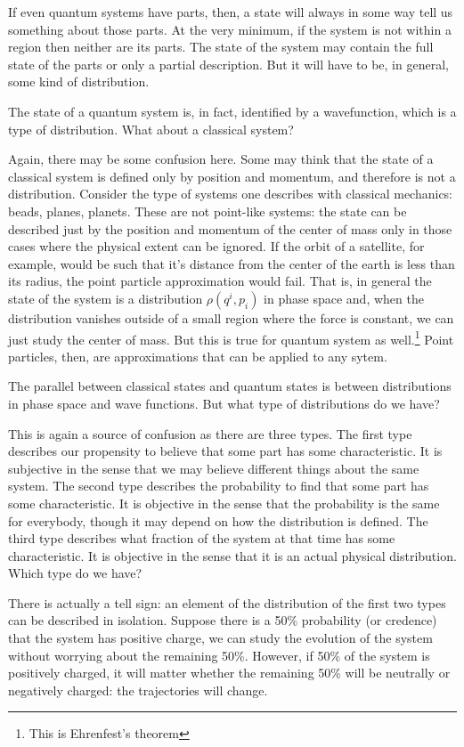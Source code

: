 \documentclass[letterpaper]{article}
\theoremstyle{plain}%
\theoremstyle{definition}
\theoremstyle{remark}
\begin{document}
If even quantum systems have parts, then, a state will always in some way tell us something about those parts. At the very minimum, if the system is not within a region then neither are its parts. The state of the system may contain the full state of the parts or only a partial description. But it will have to be, in general, some kind of distribution.

The state of a quantum system is, in fact, identified by a wavefunction, which is a type of distribution. What about a classical system?

Again, there may be some confusion here. Some may think that the state of a classical system is defined only by position and momentum, and therefore is not a distribution. Consider the type of systems one describes with classical mechanics: beads, planes, planets. These are not point-like systems: the state can be described just by the position and momentum of the center of mass only in those cases where the physical extent can be ignored. If the orbit of a satellite, for example, would be such that it's distance from the center of the earth is less than its radius, the point particle approximation would fail. That is, in general the state of the system is a distribution $\rho(q^i,p_i)$ in phase space and, when the distribution vanishes outside of a small region where the force is constant, we can just study the center of mass. But this is true for quantum system as well.\footnote{This is Ehrenfest's theorem} Point particles, then, are approximations that can be applied to any sytem.

The parallel between classical states and quantum states is between distributions in phase space and wave functions. But what type of distributions do we have?

This is again a source of confusion as there are three types. The first type describes our propensity to believe that some part has some characteristic. It is subjective in the sense that we may believe different things about the same system. The second type describes the probability to find that some part has some characteristic. It is objective in the sense that the probability is the same for everybody, though it may depend on how the distribution is defined. The third type describes what fraction of the system at that time has some characteristic. It is objective in the sense that it is an actual physical distribution. Which type do we have?

There is actually a tell sign: an element of the distribution of the first two types can be described in isolation. Suppose there is a 50\% probability (or credence) that the system has positive charge, we can study the evolution of the system without worrying about the remaining 50\%. However, if 50\% of the system is positively charged, it will matter whether the remaining 50\% will be neutrally or negatively charged: the trajectories will change.
\end{document}

